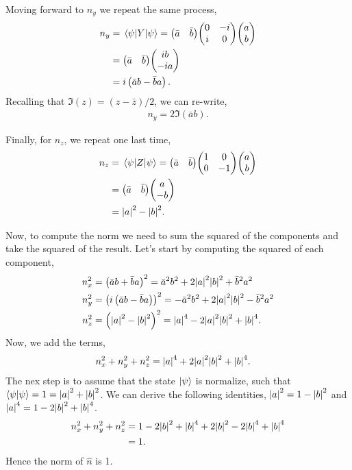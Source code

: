 \documentclass[a4paper]{tufte-handout} %
\begin{document}
Moving forward to $n_y$ we repeat the same process,
\begin{align*}
    n_y &= \expval{Y}{\psi} = \mqty(\bar{a} & \bar{b})\mqty(\pmat{2})\mqty(a \\ b) \\
        &= \mqty(\bar{a} & \bar{b})\mqty(ib \\ -ia) \\ 
        &= i\left(\bar{a}b - \bar{b}a\right).
\end{align*}
Recalling that $\Im(z)=(z-\bar{z})/2$, we can re-write,
\begin{align*}
    n_y = 2\Im(\bar{a}b).
\end{align*}

Finally, for $n_z$, we repeat one last time,
\begin{align*}
    n_z &= \expval{Z}{\psi} = \mqty(\bar{a} & \bar{b})\mqty(\pmat{3})\mqty(a \\ b) \\
        &= \mqty(\bar{a} & \bar{b})\mqty(a \\ -b) \\ 
        &= \abs{a}^2 - \abs{b}^2.
\end{align*}

Now, to compute the norm we need to sum the squared of the components and take the squared of the result.
Let's start by computing the squared of each component,
\begin{align*}
    n_x^2 &= \left(\bar{a}b + \bar{b}a\right)^2 = \bar{a}^2b^2 + 2\abs{a}^2\abs{b}^2 + \bar{b}^2a^2 \\
    n_y^2 &= \left(i\left(\bar{a}b - \bar{b}a\right)\right)^2 = -\bar{a}^2b^2 + 2\abs{a}^2\abs{b}^2 - \bar{b}^2a^2 \\
    n_z^2 &= \left(\abs{a}^2 - \abs{b}^2\right)^2 = \abs{a}^4 - 2\abs{a}^2\abs{b}^2 + \abs{b}^4.
\end{align*}
Now, we add the terms,
\begin{align*}
    n_x^2 + n_y^2 + n_z^2 &= \abs{a}^4 + 2\abs{a}^2\abs{b}^2 + \abs{b}^4. 
\end{align*}
The nex step is to assume that the state $\ket{\psi}$ is normalize, such that $\ip{\psi}{\psi}=1=\abs{a}^2+\abs{b}^2$.
We can derive the following identities, $\abs{a}^2=1-\abs{b}^2$ and  $\abs{a}^4=1-2\abs{b}^2+\abs{b}^4$.
\begin{align*}
    n_x^2 + n_y^2 + n_z^2 &= 1 - 2\abs{b}^2 + \abs{b}^4 + 
                            2\abs{b}^2 - 2\abs{b}^4 + \abs{b}^4 \\
                          &= 1.
\end{align*}
Hence the norm of $\hat{n}$ is \num{1}.
\end{document}
